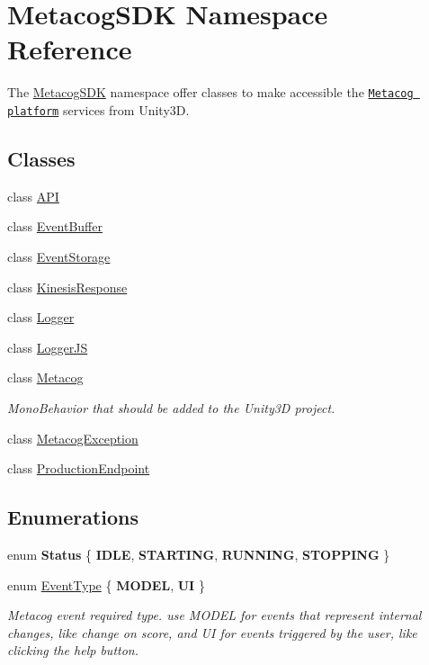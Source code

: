 \hypertarget{namespaceMetacogSDK}{}\section{Metacog\+S\+DK Namespace Reference}
\label{namespaceMetacogSDK}


The \hyperlink{namespaceMetacogSDK}{Metacog\+S\+DK} namespace offer classes to make accessible the \href{}{\tt Metacog platform} services from Unity3D.  


\subsection*{Classes}
\begin{DoxyCompactItemize}
\item 
class \hyperlink{classMetacogSDK_1_1API}{A\+PI}
\item 
class \hyperlink{classMetacogSDK_1_1EventBuffer}{Event\+Buffer}
\item 
class \hyperlink{classMetacogSDK_1_1EventStorage}{Event\+Storage}
\item 
class \hyperlink{classMetacogSDK_1_1KinesisResponse}{Kinesis\+Response}
\item 
class \hyperlink{classMetacogSDK_1_1Logger}{Logger}
\item 
class \hyperlink{classMetacogSDK_1_1LoggerJS}{Logger\+JS}
\item 
class \hyperlink{classMetacogSDK_1_1Metacog}{Metacog}
\begin{DoxyCompactList}\small\item\em Mono\+Behavior that should be added to the Unity3D project. \end{DoxyCompactList}\item 
class \hyperlink{classMetacogSDK_1_1MetacogException}{Metacog\+Exception}
\item 
class \hyperlink{classMetacogSDK_1_1ProductionEndpoint}{Production\+Endpoint}
\end{DoxyCompactItemize}
\subsection*{Enumerations}
\begin{DoxyCompactItemize}
\item 
enum {\bfseries Status} \{ {\bfseries I\+D\+LE}, 
{\bfseries S\+T\+A\+R\+T\+I\+NG}, 
{\bfseries R\+U\+N\+N\+I\+NG}, 
{\bfseries S\+T\+O\+P\+P\+I\+NG}
 \}\hypertarget{namespaceMetacogSDK_adb09f0e6c9abe254160c91be5ac0c9b1}{}\label{namespaceMetacogSDK_adb09f0e6c9abe254160c91be5ac0c9b1}

\item 
enum \hyperlink{namespaceMetacogSDK_a9a46be6b2e98a6ae7460c93faf69728e}{Event\+Type} \{ {\bfseries M\+O\+D\+EL}, 
{\bfseries UI}
 \}\begin{DoxyCompactList}\small\item\em Metacog event required type. use M\+O\+D\+EL for events that represent internal changes, like change on score, and UI for events triggered by the user, like clicking the help button. \end{DoxyCompactList}
\end{DoxyCompactItemize}


